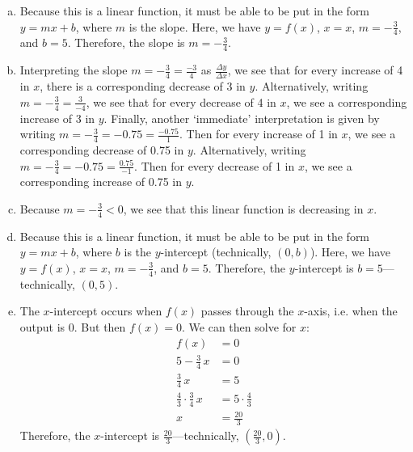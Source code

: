 \documentclass[11pt,letterpaper]{article}
\begin{document}
\sol
\begin{enumerate}[(a)]
\item Because this is a linear function, it must be able to be put in the form $y= mx + b$, where $m$ is the slope. Here, we have $y= f(x)$, $x= x$, $m= -\frac{3}{4}$, and $b= 5$. Therefore, the slope is $m= -\frac{3}{4}$. \pspace

\item Interpreting the slope $m= -\frac{3}{4}= \frac{-3}{4}$ as $\frac{\Delta y}{\Delta x}$, we see that for every increase of 4 in $x$, there is a corresponding decrease of 3 in $y$. Alternatively, writing $m= -\frac{3}{4}= \frac{3}{-4}$, we see that for every decrease of 4 in $x$, we see a corresponding increase of 3 in $y$. Finally, another `immediate' interpretation is given by writing $m= -\frac{3}{4}= -0.75= \frac{-0.75}{1}$. Then for every increase of 1 in $x$, we see a corresponding decrease of 0.75 in $y$. Alternatively, writing $m= -\frac{3}{4}= -0.75= \frac{0.75}{-1}$. Then for every decrease of 1 in $x$, we see a corresponding increase of 0.75 in $y$. \pspace

\item Because $m= -\frac{3}{4} < 0$, we see that this linear function is decreasing in $x$. \pspace

\item Because this is a linear function, it must be able to be put in the form $y= mx + b$, where $b$ is the $y$-intercept (technically, $(0, b)$). Here, we have $y= f(x)$, $x= x$, $m= -\frac{3}{4}$, and $b= 5$. Therefore, the $y$-intercept is $b= 5$---technically, $(0, 5)$. \pspace

\item The $x$-intercept occurs when $f(x)$ passes through the $x$-axis, i.e. when the output is 0. But then $f(x)= 0$. We can then solve for $x$:
	\[
	\begin{aligned}
	f(x)&= 0 \\
	5 - \frac{3}{4}\,x&= 0 \\
	\frac{3}{4}\,x&= 5 \\
	\frac{4}{3} \cdot \frac{3}{4}\,x&= 5 \cdot \frac{4}{3} \\
	x&= \frac{20}{3}
	\end{aligned}
	\]
Therefore, the $x$-intercept is $\frac{20}{3}$---technically, $(\frac{20}{3}, 0)$. 
\end{enumerate}



\newpage
\end{document}

